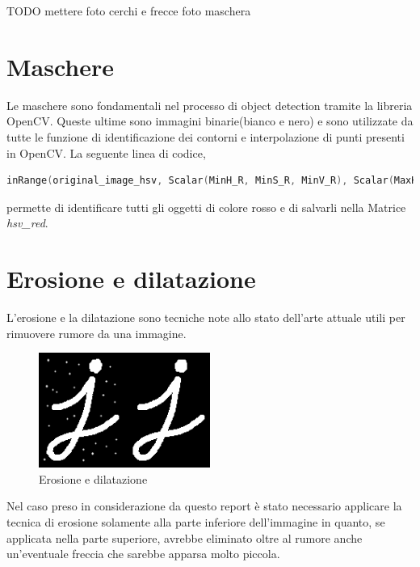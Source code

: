 TODO mettere foto cerchi e frecce
foto maschera

\section{Maschere}
Le maschere sono fondamentali nel processo di object detection tramite la libreria OpenCV.
Queste ultime sono immagini binarie(bianco e nero) e sono utilizzate da tutte le funzione di identificazione dei contorni e interpolazione di punti presenti in OpenCV.
La seguente linea di codice,
\begin{lstlisting}[language=c]
inRange(original_image_hsv, Scalar(MinH_R, MinS_R, MinV_R), Scalar(MaxH_R, MaxS_R, MaxV_R), hsv_red);
\end{lstlisting}
permette di identificare tutti gli oggetti di colore rosso e di salvarli nella Matrice \textit{hsv\_red}.
\section{Erosione e dilatazione}
L'erosione e la dilatazione sono tecniche note allo stato dell'arte attuale utili per rimuovere rumore da una immagine.

\begin{figure}[H]
	\centering
	\includegraphics[width=0.5\textwidth]{Immagini/erosion_dil.png}
	\caption{Erosione e dilatazione}
	\label{fig:erosion_dil}
\end{figure}

Nel caso preso in considerazione da questo report è stato necessario applicare la tecnica di erosione solamente alla parte inferiore dell'immagine in quanto, se applicata nella parte superiore, avrebbe eliminato oltre al rumore anche un'eventuale freccia che sarebbe apparsa molto piccola.
